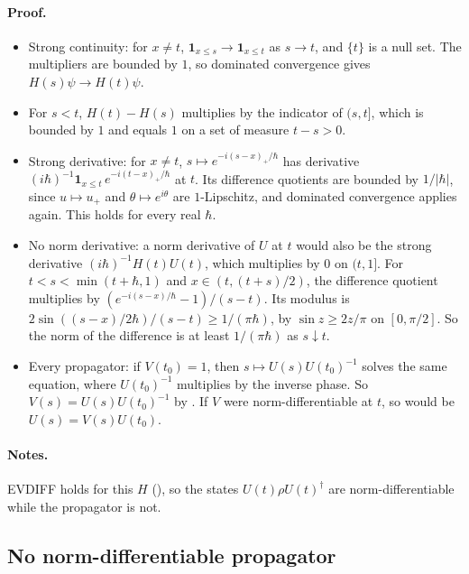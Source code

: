 \documentclass[11pt]{article}
\begin{document}
\paragraph{Proof.}
\begin{itemize}
\item Strong continuity: for $x \ne t$, $\mathbf 1_{x \le s} \to \mathbf 1_{x \le t}$ as
  $s \to t$, and $\{t\}$ is a null set. The multipliers are bounded by $1$, so dominated
  convergence gives $H(s)\psi \to H(t)\psi$.
\item For $s < t$, $H(t) - H(s)$ multiplies by the indicator of $(s,t]$, which is bounded by $1$
  and equals $1$ on a set of measure $t - s > 0$.
\item Strong derivative: for $x \ne t$, $s \mapsto e^{-i(s-x)_+/\hbar}$ has derivative
  $(i\hbar)^{-1}\mathbf 1_{x \le t}\,e^{-i(t-x)_+/\hbar}$ at $t$. Its difference quotients are
  bounded by $1/|\hbar|$, since $u \mapsto u_+$ and $\theta \mapsto e^{i\theta}$ are
  $1$-Lipschitz, and dominated convergence applies again. This holds for every real $\hbar$.
\item No norm derivative: a norm derivative of $U$ at $t$ would also be the strong derivative
  $(i\hbar)^{-1}H(t)U(t)$, which multiplies by $0$ on $(t,1]$. For $t < s < \min(t+\hbar, 1)$
  and $x \in (t, (t+s)/2)$, the difference quotient multiplies by
  $(e^{-i(s-x)/\hbar} - 1)/(s-t)$. Its modulus is $2\sin((s-x)/2\hbar)/(s-t) \ge 1/(\pi\hbar)$,
  by $\sin z \ge 2z/\pi$ on $[0, \pi/2]$. So the norm of the difference is at least
  $1/(\pi\hbar)$ as $s \downarrow t$.
\item Every propagator: if $V(t_0) = 1$, then $s \mapsto U(s)U(t_0)^{-1}$ solves the same
  equation, where $U(t_0)^{-1}$ multiplies by the inverse phase. So
  $V(s) = U(s)U(t_0)^{-1}$ by . If $V$ were
  norm-differentiable at $t$, so would be $U(s) = V(s)U(t_0)$.
\end{itemize}

\paragraph{Notes.} EVDIFF holds for this $H$ (), so
the states $U(t)\rho U(t)^\dagger$ are norm-differentiable while the propagator is not.

\subsection{No norm-differentiable propagator}\label{sec:unitary-entropy-norm}
\end{document}
